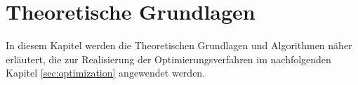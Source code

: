 \chapter{Theoretische Grundlagen}

In diesem Kapitel werden die Theoretischen Grundlagen und Algorithmen näher erläutert, die zur Realisierung der Optimierungsverfahren im nachfolgenden Kapitel \ref{sec:optimization} angewendet werden. 








